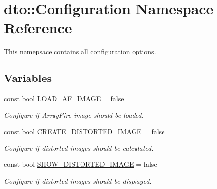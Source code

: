 \hypertarget{namespacedto_1_1_configuration}{}\section{dto\+:\+:Configuration Namespace Reference}
\label{namespacedto_1_1_configuration}


This namepsace contains all configuration options.  


\subsection*{Variables}
\begin{DoxyCompactItemize}
\item 
\mbox{\label{namespacedto_1_1_configuration_a7bd9f7d623047c356092da493a7f7906}} 
const bool \mbox{\hyperlink{namespacedto_1_1_configuration_a7bd9f7d623047c356092da493a7f7906}{L\+O\+A\+D\+\_\+\+A\+F\+\_\+\+I\+M\+A\+GE}} = false
\begin{DoxyCompactList}\small\item\em Configure if Array\+Fire image should be loaded. \end{DoxyCompactList}\item 
\mbox{\label{namespacedto_1_1_configuration_a2d30b6b1bee43531bf31092dcd46fd29}} 
const bool \mbox{\hyperlink{namespacedto_1_1_configuration_a2d30b6b1bee43531bf31092dcd46fd29}{C\+R\+E\+A\+T\+E\+\_\+\+D\+I\+S\+T\+O\+R\+T\+E\+D\+\_\+\+I\+M\+A\+GE}} = false
\begin{DoxyCompactList}\small\item\em Configure if distorted images should be calculated. \end{DoxyCompactList}\item 
\mbox{\label{namespacedto_1_1_configuration_a6ea75e467961ab4573e8c63e5c7ce875}} 
const bool \mbox{\hyperlink{namespacedto_1_1_configuration_a6ea75e467961ab4573e8c63e5c7ce875}{S\+H\+O\+W\+\_\+\+D\+I\+S\+T\+O\+R\+T\+E\+D\+\_\+\+I\+M\+A\+GE}} = false
\begin{DoxyCompactList}\small\item\em Configure if distorted images should be displayed. \end{DoxyCompactList}\item 
\mbox{\label{namespacedto_1_1_configuration_a1706f8e4ae268f98714d25206f6b9baa}} 

\end{DoxyCompactItemize}
